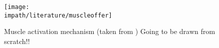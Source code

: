 %
\begin{figure}%
\centering
\texttt{[image: \\impath/literature/muscleoffer]}%
\caption[Muscle activation mechanism]{Muscle activation mechanism (taken from \cite{offer}) Going to be drawn from scratch!!}%
\label{fig:lit:muscle}%
\end{figure}

